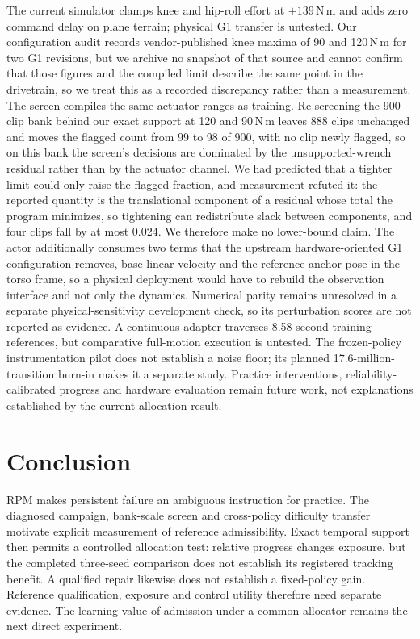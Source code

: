 \documentclass[letterpaper,10pt,conference]{ieeeconf}
\begin{document}
The current simulator clamps knee and hip-roll effort at $\pm139$\,N\,m and adds zero command
delay on plane terrain; physical G1 transfer is untested. Our configuration audit records
vendor-published knee maxima of 90 and 120\,N\,m for two G1 revisions, but we archive no snapshot
of that source and cannot confirm that those figures and the compiled limit describe the same
point in the drivetrain, so we treat this as a recorded discrepancy rather than a measurement.
The screen compiles the same actuator ranges as training. Re-screening the 900-clip bank behind
our exact support at 120 and 90\,N\,m leaves 888 clips unchanged and moves the flagged count from
99 to 98 of 900, with no clip newly flagged, so on this bank the screen's decisions are dominated
by the unsupported-wrench residual rather than by the actuator channel. We had predicted that a
tighter limit could only raise the flagged fraction, and measurement refuted it: the reported
quantity is the translational component of a residual whose total the program minimizes, so
tightening can redistribute slack between components, and four clips fall by at most 0.024. We
therefore make no lower-bound claim. The actor additionally consumes two terms
that the upstream hardware-oriented G1 configuration removes, base linear velocity and the
reference anchor pose in the torso frame, so a physical deployment would have to rebuild the
observation interface and not only the dynamics. Numerical
parity remains unresolved in a separate physical-sensitivity development check, so
its perturbation scores are not reported as evidence. A continuous adapter traverses
8.58-second training references, but comparative full-motion execution is untested.
The frozen-policy instrumentation pilot does not establish a noise floor; its planned
17.6-million-transition burn-in makes it a separate study. Practice interventions,
reliability-calibrated progress and hardware evaluation remain future work, not
explanations established by the current allocation result.

\section{Conclusion}
RPM makes persistent failure an ambiguous instruction for practice. The diagnosed
campaign, bank-scale screen and cross-policy difficulty transfer motivate explicit
measurement of reference admissibility. Exact temporal support then permits a controlled
allocation test: relative progress changes exposure, but the completed three-seed
comparison does not establish its registered tracking benefit. A qualified repair likewise
does not establish a fixed-policy gain. Reference qualification, exposure and control
utility therefore need separate evidence. The learning value of admission under a common
allocator remains the next direct experiment.
\end{document}
